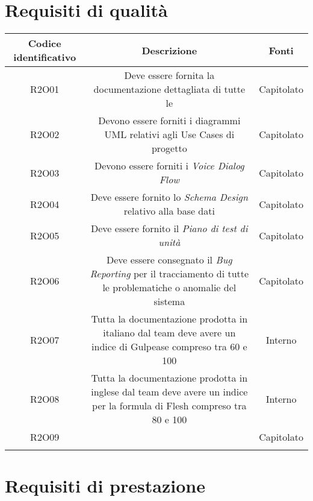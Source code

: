 \section{Requisiti di qualità}
\begin{tabularx}{\textwidth}{|C|C|C|}
	\hline
	\textbf{Codice identificativo} & \textbf{Descrizione} & \textbf{Fonti} \\
	\hline
	\endhead
	R2O01 & Deve essere fornita la documentazione dettagliata di tutte le  & Capitolato\\
	\hline
	R2O02 & Devono essere forniti i diagrammi UML relativi agli Use Cases di progetto  & Capitolato\\
	\hline
	R2O03 & Devono essere forniti i \textit{Voice Dialog Flow} & Capitolato\\
	\hline
	R2O04 & Deve essere fornito lo \textit{Schema Design} relativo alla base dati  & Capitolato\\
	\hline
	R2O05 & Deve essere fornito il \textit{Piano di test di unità} & Capitolato\\
	\hline
	R2O06 & Deve essere consegnato il \textit{Bug Reporting} per il tracciamento di
	tutte le problematiche o anomalie del sistema & Capitolato\\
	\hline
	R2O07 & Tutta la documentazione prodotta in italiano dal team deve avere
	un indice di Gulpease compreso tra 60 e 100 & Interno\\
	\hline
	R2O08 & Tutta la documentazione prodotta in inglese dal team deve avere
	un indice per la formula di Flesh compreso tra 80 e 100 & Interno\\
	\hline
	R2O09 &  & Capitolato\\
	\hline
    \caption{Tabella requisiti di qualità}
\end{tabularx}

\section{Requisiti di prestazione}

